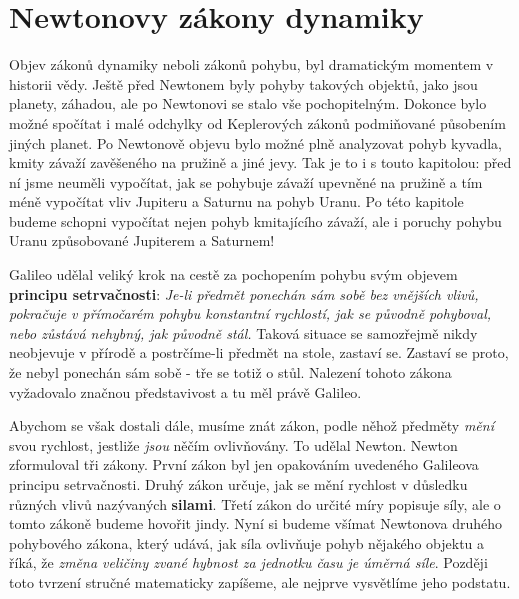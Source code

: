 {
\chapter{Newtonovy zákony dynamiky}\label{fyz:IchapIX}
\minitoc
    Objev zákonů dynamiky neboli zákonů pohybu, byl dramatickým momentem v historii vědy. Ještě 
    před Newtonem byly pohyby takových objektů, jako jsou planety, záhadou, ale po Newtonovi se 
    stalo vše pochopitelným. Dokonce bylo možné spočítat i malé odchylky od Keplerových zákonů 
    podmiňované působením jiných planet. Po Newtonově objevu bylo možné plně analyzovat pohyb 
    kyvadla, kmity závaží zavěšeného na pružině a jiné jevy. Tak je to i s touto kapitolou: před ní 
    jsme neuměli vypočítat, jak se pohybuje závaží upevněné na pružině a tím méně vypočítat vliv 
    Jupiteru a Saturnu na pohyb Uranu. Po této kapitole budeme schopni vypočítat nejen pohyb 
    kmitajícího závaží, ale i poruchy pohybu Uranu způsobované Jupiterem a Saturnem!
    
    Galileo udělal veliký krok na cestě za pochopením pohybu svým objevem \textbf{principu 
    setrvačnosti}: \emph{Je-li předmět ponechán sám sobě bez vnějších vlivů, pokračuje v přímočarém 
    pohybu konstantní rychlostí, jak se původně pohyboval, nebo zůstává nehybný, jak původně stál.} 
    Taková situace se samozřejmě nikdy neobjevuje v přírodě a postrčíme-li předmět na stole, 
    zastaví se. Zastaví se proto, že nebyl ponechán sám sobě - tře se totiž o stůl. Nalezení tohoto 
    zákona vyžadovalo značnou představivost a tu měl právě Galileo.
    
    Abychom se však dostali dále, musíme znát zákon, podle něhož předměty \emph{mění} svou 
    rychlost, jestliže \emph{jsou} něčím ovlivňovány. To udělal Newton. Newton zformuloval tři 
    zákony. První zákon byl jen opakováním uvedeného Galileova principu setrvačnosti. Druhý zákon 
    určuje, jak se mění rychlost v důsledku různých vlivů nazývaných \textbf{silami}. Třetí zákon 
    do určité míry popisuje síly, ale o tomto zákoně budeme hovořit jindy. Nyní si budeme všímat 
    Newtonova druhého pohybového zákona, který udává, jak síla ovlivňuje pohyb nějakého objektu a 
    říká, že \emph{změna veličiny zvané hybnost za jednotku času je úměrná síle}. Později toto 
    tvrzení stručné matematicky zapíšeme, ale nejprve vysvětlíme jeho podstatu.
    
}
